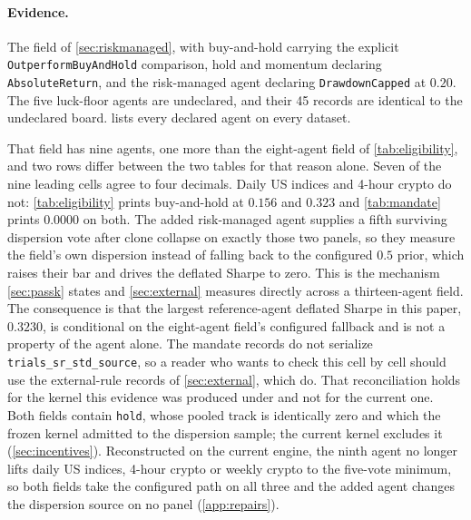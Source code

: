 \paragraph{Evidence.} The field of \cref{sec:riskmanaged}, with buy-and-hold carrying the explicit \texttt{OutperformBuyAndHold} comparison, hold and momentum declaring \texttt{AbsoluteReturn}, and the risk-managed agent declaring \texttt{DrawdownCapped} at $0.20$. The five luck-floor agents are undeclared, and their 45 records are identical to the undeclared board.  lists every declared agent on every dataset.

That field has nine agents, one more than the eight-agent field of \cref{tab:eligibility}, and two rows differ between the two tables for that reason alone. Seven of the nine leading cells agree to four decimals. Daily US indices and 4-hour crypto do not: \cref{tab:eligibility} prints buy-and-hold at $0.156$ and $0.323$ and \cref{tab:mandate} prints $0.0000$ on both. The added risk-managed agent supplies a fifth surviving dispersion vote after clone collapse on exactly those two panels, so they measure the field's own dispersion instead of falling back to the configured $0.5$ prior, which raises their bar and drives the deflated Sharpe to zero. This is the mechanism \cref{sec:passk} states and \cref{sec:external} measures directly across a thirteen-agent field. The consequence is that the largest reference-agent deflated Sharpe in this paper, $0.3230$, is conditional on the eight-agent field's configured fallback and is not a property of the agent alone. The mandate records do not serialize \texttt{trials\_sr\_std\_source}, so a reader who wants to check this cell by cell should use the external-rule records of \cref{sec:external}, which do. That reconciliation holds for the kernel this evidence was produced under and not for the current one. Both fields contain \texttt{hold}, whose pooled track is identically zero and which the frozen kernel admitted to the dispersion sample; the current kernel excludes it (\cref{sec:incentives}). Reconstructed on the current engine, the ninth agent no longer lifts daily US indices, 4-hour crypto or weekly crypto to the five-vote minimum, so both fields take the configured path on all three and the added agent changes the dispersion source on no panel (\cref{app:repairs}).

